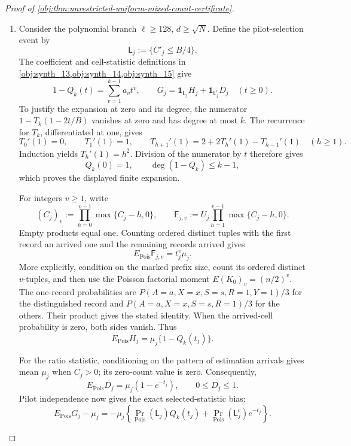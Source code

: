 \begin{proof}[Proof of \cref{obj:thm:unrestricted-uniform-mixed-count-certificate}]
\begin{enumerate}
\item Consider the polynomial branch
\(\ell\ge128\), \(d\ge\sqrt N\). Define the pilot-selection event by
\[
\mathsf L_j:=\{C'_j\le B/4\}.
\]
The coefficient and cell-statistic definitions in
\cref{obj:synth_13,obj:synth_14,obj:synth_15} give
\[
1-Q_k(t)=\sum_{v=1}^{k-1}a_vt^v,
\qquad
G_j=\mathbf1_{\mathsf L_j}H_j+
\mathbf1_{\mathsf L_j^c}D_j
\quad(t\ge0).
\]
To justify the expansion at zero and its degree, the numerator
\(1-T_k(1-2t/B)\) vanishes at zero and has degree at most \(k\).
The recurrence for \(T_k\), differentiated at one, gives
\[
T_0'(1)=0,\qquad T_1'(1)=1,\qquad
T_{h+1}'(1)=2+2T_h'(1)-T_{h-1}'(1)
\quad(h\ge1).
\]
Induction yields \(T_h'(1)=h^2\). Division of the numerator by \(t\)
therefore gives
\[
Q_k(0)=1,\qquad \deg(1-Q_k)\le k-1,
\]
which proves the displayed finite expansion.

For integers \(v\ge1\), write
\[
(C_j)_v:=\prod_{h=0}^{v-1}\max\{C_j-h,0\},
\qquad
\mathsf F_{j,v}:=
U_j\prod_{h=1}^{v-1}\max\{C_j-h,0\}.
\]
Empty products equal one. Counting ordered distinct tuples with the first
record an arrived one and the remaining records arrived gives
\[
E_{\mathrm{Pois}}\mathsf F_{j,v}
=t_j^v\mu_j.
\]
More explicitly, condition on the marked prefix size, count its ordered
distinct \(v\)-tuples, and then use the Poisson factorial moment
\(E(K_0)_v=(n/2)^v\). The one-record probabilities are
\(P(A=a,X=x,S=s,R=1,Y=1)/3\) for the distinguished record and
\(P(A=a,X=x,S=s,R=1)/3\) for the others. Their product gives the stated
identity. When the arrived-cell probability is zero, both sides vanish.
Thus
\[
E_{\mathrm{Pois}}H_j
=\mu_j\{1-Q_k(t_j)\}.
\]

For the ratio statistic, conditioning on the pattern of estimation
arrivals gives mean \(\mu_j\) when \(C_j>0\); its zero-count value is zero.
Consequently,
\[
E_{\mathrm{Pois}}D_j=\mu_j(1-e^{-t_j}),
\qquad 0\le D_j\le1.
\]
Pilot independence now gives the exact selected-statistic bias:
\[
E_{\mathrm{Pois}}G_j-\mu_j
=-\mu_j\left\{
\Pr_{\mathrm{Pois}}(\mathsf L_j)Q_k(t_j)
+\Pr_{\mathrm{Pois}}(\mathsf L_j^c)e^{-t_j}
\right\}.
\]


\end{enumerate}
\end{proof}
